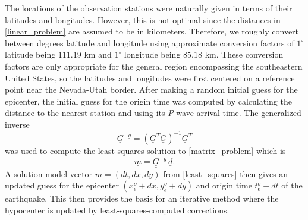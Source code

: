 \documentclass[12pt]{article}
\begin{document}
%
The locations of the observation stations were naturally given in terms of their latitudes and longitudes. However, this is not optimal since the distances in \eqref{linear_problem} are assumed to be in kilometers. Therefore, we roughly convert between degrees latitude and longitude using approximate conversion factors of $1^{\circ}$ latitude being $111.19$ km and $1^{\circ}$ longitude being $85.18$ km. These conversion factors are only appropriate for the general region encompassing the southeastern United States, so the latitudes and longitudes were first centered on a reference point near the Nevada-Utah border. After making a random initial guess for the epicenter, the initial guess for the origin time was computed by calculating the distance to the nearest station and using its \textit{P}-wave arrival time.
%
%
The generalized inverse 
$$\underline{\underline{G}}^{-g}=(\underline{\underline{G}}^T\underline{\underline{G}})^{-1}\underline{\underline{G}}^T$$
was used to compute the least-squares solution to \eqref{matrix_problem} which is
\begin{equation}
\label{least_squares}
\underline{m}=\underline{\underline{G}}^{-g}\,\underline{d}.
\end{equation}
A solution model vector $\underline{m}=(dt,dx,dy)$ from \eqref{least_squares} then gives an updated guess for the epicenter $(x^o_e+dx,y^o_e+dy)$ and origin time $t^o_e+dt$ of the earthquake. This then provides the basis for an iterative method where the hypocenter is updated by least-squares-computed corrections. 
\end{document}
